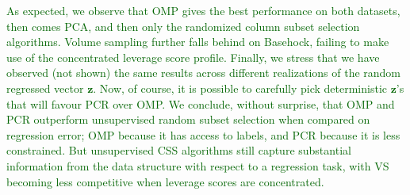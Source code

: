 \documentclass[twoside,11pt]{book}
\newcommand{\rev}[1]{\textcolor{darkgreen}{#1}}
\numberwithin{theorem}{chapter}
\numberwithin{definition}{chapter}
\numberwithin{proposition}{chapter}
\numberwithin{corollary}{chapter}
\numberwithin{example}{chapter}
\numberwithin{lemma}{chapter}
\numberwithin{assumption}{chapter}
\DeclareMathOperator{\Span}{\mathrm{Span}}
\newcommand{\rb}[1]{\textcolor{magenta}{#1}}
\begin{document}
\rev{As expected, we observe that OMP gives the best performance on both datasets, then comes PCA, and then only the randomized column subset selection algorithms. Volume sampling further falls behind on Basehock, failing to make use of the concentrated leverage score profile.
Finally, we stress that we have observed (not shown) the same results across different realizations of the random regressed vector $\mathbf{z}$. Now, of course, it is possible to carefully pick deterministic $\mathbf{z}$'s that will favour PCR over OMP.
We conclude, without surprise, that OMP and PCR outperform unsupervised random subset selection when compared on regression error; OMP because it has access to labels, and PCR because it is less constrained. But unsupervised CSS algorithms still capture substantial information from the data structure with respect to a regression task, with VS becoming less competitive when leverage scores are concentrated.
}




\end{document}
